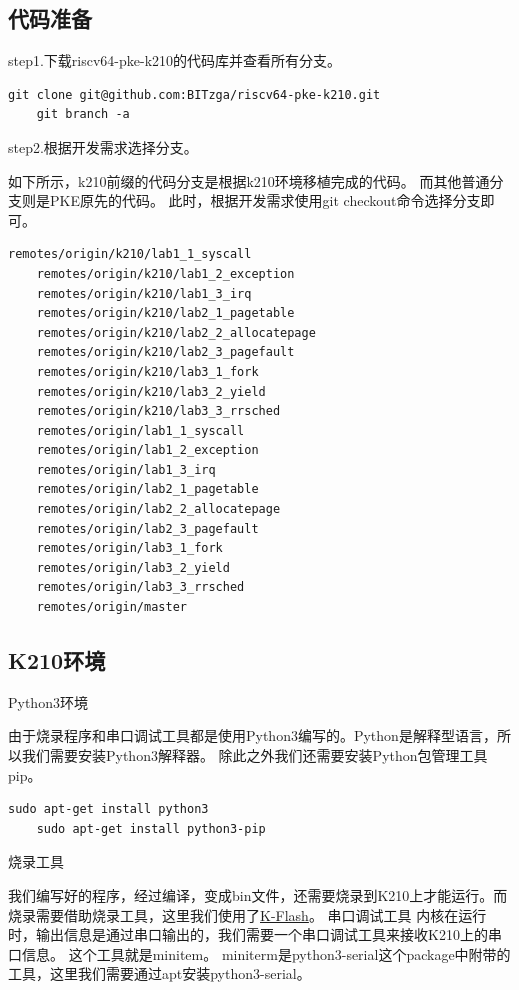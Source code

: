 \subsection{代码准备}

step1.下载riscv64-pke-k210的代码库并查看所有分支。

\begin{lstlisting}[caption={下载代码库}, label={lst:download_code}]
    git clone git@github.com:BITzga/riscv64-pke-k210.git
    git branch -a
\end{lstlisting}

step2.根据开发需求选择分支。

如下所示，k210前缀的代码分支是根据k210环境移植完成的代码。
而其他普通分支则是PKE原先的代码。
此时，根据开发需求使用git checkout命令选择分支即可。

\begin{lstlisting}[caption={分支列表}, label={lst:branch_list}]
    remotes/origin/k210/lab1_1_syscall
    remotes/origin/k210/lab1_2_exception
    remotes/origin/k210/lab1_3_irq
    remotes/origin/k210/lab2_1_pagetable
    remotes/origin/k210/lab2_2_allocatepage
    remotes/origin/k210/lab2_3_pagefault
    remotes/origin/k210/lab3_1_fork
    remotes/origin/k210/lab3_2_yield
    remotes/origin/k210/lab3_3_rrsched
    remotes/origin/lab1_1_syscall
    remotes/origin/lab1_2_exception
    remotes/origin/lab1_3_irq
    remotes/origin/lab2_1_pagetable
    remotes/origin/lab2_2_allocatepage
    remotes/origin/lab2_3_pagefault
    remotes/origin/lab3_1_fork
    remotes/origin/lab3_2_yield
    remotes/origin/lab3_3_rrsched
    remotes/origin/master
\end{lstlisting}

\subsection{K210环境}

Python3环境
    
由于烧录程序和串口调试工具都是使用Python3编写的。Python是解释型语言，所以我们需要安装Python3解释器\cite{2009Python}。
除此之外我们还需要安装Python包管理工具pip\cite{2013Installing}。

\begin{lstlisting}[caption={安装Python3环境}, label={lst:install_python3}]
    sudo apt-get install python3
    sudo apt-get install python3-pip
\end{lstlisting}

烧录工具

我们编写好的程序，经过编译，变成bin文件，还需要烧录到K210上才能运行。而烧录需要借助烧录工具，这里我们使用了\href{https://github.com/BITzga/riscv64-pke-k210/blob/master/compile_tool/kflash.py}{K-Flash}。
串口调试工具
内核在运行时，输出信息是通过串口输出的，我们需要一个串口调试工具来接收K210上的串口信息。
这个工具就是minitem。
miniterm是python3-serial这个package中附带的工具，这里我们需要通过apt安装python3-serial。

